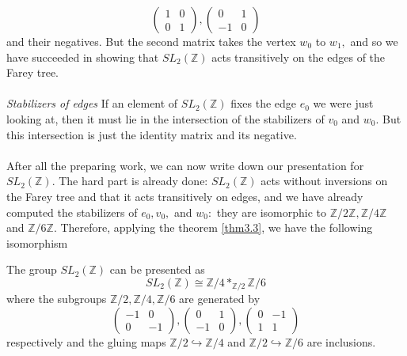 \[
\left(\begin{array}{ll}
1 & 0 \\
0 & 1
\end{array}\right),\left(\begin{array}{rr}
0 & 1 \\
-1 & 0
\end{array}\right)
\]
and their negatives. But the second matrix takes the vertex $w_{0}$ to $w_{1},$ and so we have succeeded in showing that $SL_2(\mathbb{Z})$ acts transitively on the edges of the Farey tree.
\\
\\
\noindent
\textit{Stabilizers of edges} If an element of $SL_2(\mathbb{Z})$ fixes the edge $e_{0}$ we were just looking at, then it must lie in the intersection of the stabilizers of $v_{0}$ and $w_{0} .$ But this intersection is just the identity matrix and its negative.
\\
\\
After all the preparing work, we can now write down our presentation for $SL_2(\mathbb{Z})$. The hard part is already done: $SL_2(\mathbb{Z})$ acts without inversions on the Farey tree and that it acts transitively on edges, and we have already computed the stabilizers of $e_{0}, v_{0},$ and $w_{0}:$ they are isomorphic to $\mathbb{Z} / 2 \mathbb{Z}, \mathbb{Z} / 4 \mathbb{Z}$ and $\mathbb{Z} / 6 \mathbb{Z}$. Therefore, applying the theorem \ref{thm3.3}, we have the following isomorphism
\begin{theorem}
\label{thmain}
The group $SL_2(\mathbb{Z})$ can be presented as
\[
S L_{2}(\mathbb{Z}) \cong \mathbb{Z} / 4 *_{\mathbb{Z} / 2} \mathbb{Z} / 6
\]
where the subgroups $\mathbb{Z} / 2, \mathbb{Z} / 4, \mathbb{Z} / 6$ are generated by
\[
\left(\begin{array}{rr}
-1 & 0 \\
0 & -1
\end{array}\right),\left(\begin{array}{cc}
0 & 1 \\
-1 & 0
\end{array}\right),\left(\begin{array}{rr}
0 & -1 \\
1 & 1
\end{array}\right)
\]
respectively and the gluing maps $\mathbb{Z} / 2\hookrightarrow\mathbb{Z} /4$ and $\mathbb{Z} / 2\hookrightarrow\mathbb{Z} /6$ are inclusions.
\end{theorem}